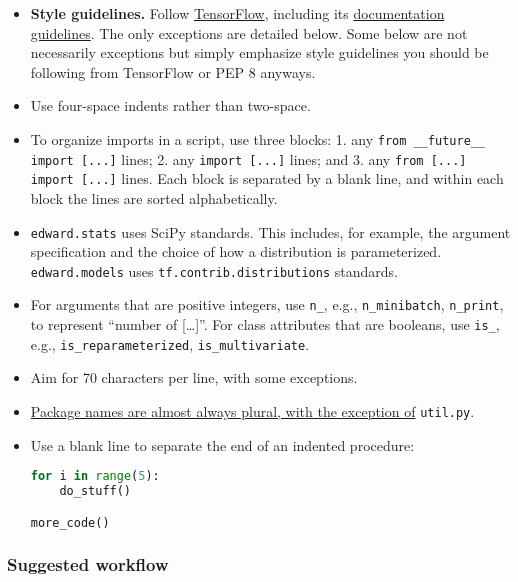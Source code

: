 \begin{itemize}
\item
  \textbf{Style guidelines.}
  Follow
  \href{https://www.tensorflow.org/versions/r0.9/how_tos/style_guide.html}{TensorFlow},
  including its
  \href{https://www.tensorflow.org/versions/r0.9/how_tos/documentation/index.html}{documentation guidelines}.
  The only exceptions are detailed below. Some below are not
  necessarily exceptions but simply emphasize style guidelines you
  should be following from TensorFlow or PEP 8 anyways.
\item
  Use four-space indents rather than two-space.
\item
  To organize imports in a script, use three blocks: 1. any \texttt{from __future__
  import [...]} lines; 2. any \texttt{import [...]} lines; and 3. any
  \texttt{from [...] import [...]} lines. Each block is separated by a blank line,
  and within each block the lines are sorted alphabetically.
\item
  \texttt{edward.stats} uses SciPy standards. This
  includes, for example, the argument specification and the choice of
  how a distribution is parameterized. \texttt{edward.models}
  uses \texttt{tf.contrib.distributions} standards.
\item
  For arguments that are positive integers, use \texttt{n\_}, e.g.,
  \texttt{n\_minibatch}, \texttt{n\_print}, to represent ``number of
  {[}\ldots{}{]}''.  For class attributes that are booleans, use
  \texttt{is_}, e.g., \texttt{is_reparameterized},
  \texttt{is_multivariate}.
\item
  Aim for 70 characters per line, with some exceptions.
\item
  \href{http://programmers.stackexchange.com/questions/75919/should-package-names-be-singular-or-plural}{Package
  names are almost always plural, with the exception of} \texttt{util.py}.
\item
  Use a blank line to separate the end of an indented procedure:
\begin{lstlisting}[language=Python]
for i in range(5):
    do_stuff()

more_code()
\end{lstlisting}
\end{itemize}


\subsubsection{Suggested workflow}\label{suggested-workflow}

